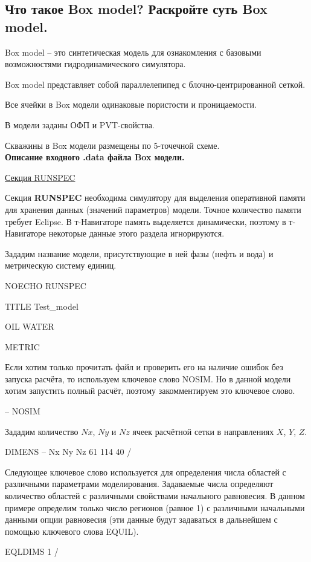 

\subsection{Что такое Box model? Раскройте суть Box model.}

Box model -- это синтетическая модель для ознакомления с базовыми возможностями гидродинамического симулятора.

Box model представляет собой параллелепипед с блочно-центрированной сеткой.

Все ячейки в Box модели одинаковые пористости и проницаемости.

В модели заданы ОФП и PVT-свойства.

Скважины в Box модели размещены по 5-точечной схеме.
\\

\textbf{Описание входного .data файла Box модели.}

\underline{Секция RUNSPEC}

Секция \textbf{RUNSPEC} необходима симулятору для выделения оперативной памяти для хранения данных (значений параметров) модели.
Точное количество памяти требует Eclipse.
В т-Навигаторе память выделяется динамически, поэтому в т-Навигаторе некоторые данные этого раздела игнорируются. 

Зададим название модели, присутствующие в ней фазы (нефть и вода) и метрическую систему единиц.

\begin{eclrun}
NOECHO
RUNSPEC

TITLE
Test_model

OIL
WATER

METRIC
\end{eclrun}

Если хотим только прочитать файл и проверить его на наличие ошибок без запуска расчёта, то используем ключевое слово NOSIM.
Но в данной модели хотим запустить полный расчёт, поэтому закомментируем это ключевое слово.
\begin{eclrun}
-- NOSIM
\end{eclrun}

Зададим количество $Nx$, $Ny$ и $Nz$ ячеек расчётной сетки в направлениях $X$, $Y$, $Z$.

\begin{eclrun}
DIMENS
-- Nx  Ny   Nz
   61  114  40 /
\end{eclrun}

Следующее ключевое слово используется для определения числа областей с различными параметрами моделирования.
Задаваемые числа определяют количество областей с различными свойствами начального равновесия.
В данном примере определим только число регионов (равное 1) с различными начальными данными опции равновесия (эти данные будут задаваться в дальнейшем с помощью ключевого слова EQUIL).
\begin{eclrun}
EQLDIMS
 1  /
\end{eclrun}

